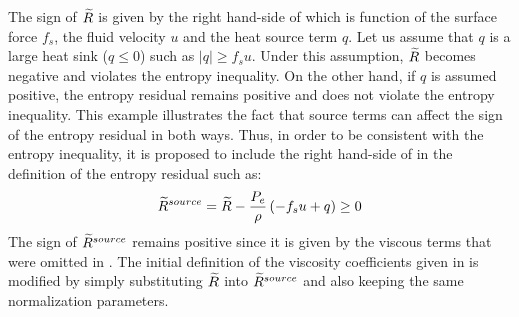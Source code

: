 The sign of $\widetilde{R}$ is given by the right hand-side of  which is function of the surface force $f_s$, the fluid velocity $u$ and the heat source term $q$. Let us assume that $q$ is a large heat sink ($q\leq0$) such as $| q| \geq f_s u$. Under this assumption, $\widetilde{R}$ becomes negative and violates the entropy inequality. On the other hand, if $q$ is assumed positive, the entropy residual remains positive and does not violate the entropy inequality. This example illustrates the fact that source terms can affect the sign of the entropy residual in both ways. Thus, in order to be consistent with the entropy inequality, it is proposed to include the right hand-side of  in the definition of the entropy residual such as:
%
\begin{equation}\label{eq:ent_res_source_term3}
\widetilde{R}^{source} = \widetilde{R} - \frac{P_e}{\rho} \left( -f_s u + q \right) \geq 0
\end{equation}
%
The sign of $\widetilde{R}^{source}$ remains positive since it is given by the viscous terms that were omitted in . The initial definition of the viscosity coefficients given in  is modified by simply substituting $\widetilde{R}$ into $\widetilde{R}^{source}$ and also keeping the same normalization parameters.

